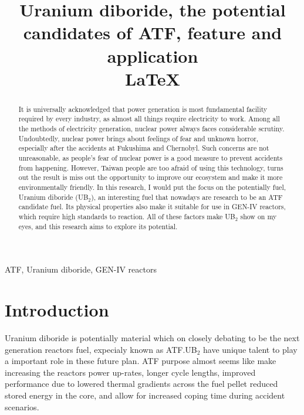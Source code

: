 \documentclass[final,12pt,times,twocolumn]{elsarticle}
\begin{document}
\begin{frontmatter}
\title{Uranium diboride, the potential candidates of ATF, feature and application \\ \LaTeX}
\begin{abstract}
It is universally acknowledged that power generation is most fundamental facility required by every industry, as almost all things require electricity to work. Among all the methods of electricity generation, nuclear power always faces considerable scrutiny. Undoubtedly, nuclear power brings about feelings of fear and unknown horror, especially after the accidents at Fukushima and Chernobyl. Such concerns are not unreasonable, as people's fear of nuclear power is a good measure to prevent accidents from happening. However, Taiwan people are too afraid of using this technology, turns out the result is miss out the opportunity to improve our ecosystem and make it more environmentally friendly. In this research, I would put the focus on the potentially fuel, Uranium diboride (UB$_{2}$), an interesting fuel that nowadays are research to be an ATF candidate fuel. Its physical properties also make it suitable for use in GEN-IV reactors, which require high standards to reaction. All of these factors make UB$_{2}$ show on my eyes, and this research aims to explore its potential.
\end{abstract}

\begin{keyword}
ATF, Uranium diboride, GEN-IV reactors
\end{keyword}

\end{frontmatter}

\section{Introduction}
Uranium diboride is potentially material which on closely debating to be the next generation reactors fuel, expecialy known as ATF.\@ UB$_{2}$ have unique talent to play a important role in these future plan. ATF purpose almost seems like make increasing the reactors power up-rates, longer cycle lengths, improved performance due to lowered thermal gradients across the fuel pellet reduced stored energy in the core, and allow for increased coping time during accident scenarios.
\end{document}

